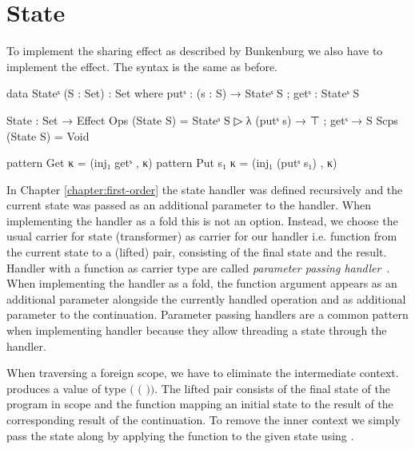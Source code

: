 \begin{code}
\end{code}

\section{State}
\label{scoped-algebra:state}

To implement the sharing effect as described by Bunkenburg we also have to
implement the  effect.
The syntax is the same as before.

\begin{code}
data Stateˢ (S : Set) : Set where putˢ : (s : S) → Stateˢ S ; getˢ : Stateˢ S

State : Set → Effect
Ops   (State S) = Stateˢ S ▷ λ{ (putˢ s) → ⊤ ; getˢ → S }
Scps  (State S) = Void

pattern Get κ     = (inj₁ getˢ , κ)
pattern Put s₁ κ  = (inj₁ (putˢ s₁) , κ)
\end{code}
In Chapter \ref{chapter:first-order} the state handler was defined recursively
and the current state was passed as an additional parameter to the handler.
When implementing the handler as a fold this is not an option.
Instead, we choose the usual carrier for state (transformer) as carrier for our handler i.e.
function from the current state to a (lifted) pair, consisting of the final
state and the result.
Handler with a function as carrier type are called \textit{parameter passing
  handler}~\cite{DBLP:conf/esop/PlotkinP09}.
When implementing the handler as a fold, the function argument appears as an
additional parameter alongside the currently handled operation and as
additional parameter to the continuation.
Parameter passing handlers are a common pattern when implementing handler
because they allow threading a state through the handler.

When traversing a foreign scope, we have to eliminate the intermediate context.
 produces a value of type
\AgdaSpace{}\AgdaSpace{}$($%
\AgdaSpace{}\AgdaSpace{}$($%
\AgdaSpace{}\AgdaSpace{}%
\AgdaSpace{}\AgdaSpace{}$)$$)$.
The lifted pair consists of the final state of the program in scope and the
function mapping an initial state to the result of the corresponding result of
the continuation.
To remove the inner context we simply pass the state along by applying the
function to the given state using .

